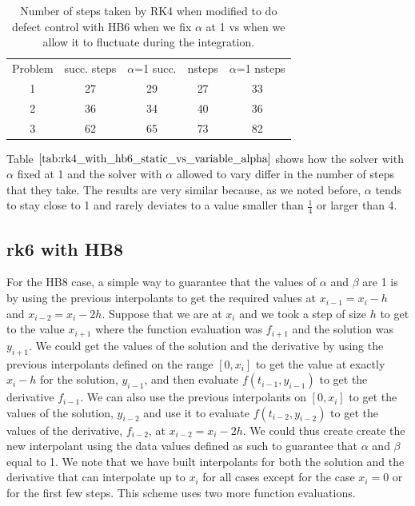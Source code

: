 \begin{table}[h]
\caption {Number of steps taken by RK4 when modified to do defect control with HB6 when we fix $\alpha$ at 1 vs when we allow it to fluctuate during the integration.} \label{tab:rk4_with_hb6_static_vs_variable_alpha}
\begin{center}
\begin{tabular}{ c c c c c } 
Problem & succ. steps & $\alpha$=1 succ. & nsteps & $\alpha$=1 nsteps \\ 
1       & 27                      &        29               & 27         & 33\\ 
2       & 36                      &        34               & 40         & 36\\
3       & 62                      &        65               & 73         & 82\\
\end{tabular}
\end{center}
\end{table}

Table $\ref{tab:rk4_with_hb6_static_vs_variable_alpha}$ shows how the solver with $\alpha$ fixed at 1 and the solver with $\alpha$ allowed to vary differ in the number of steps that they take. The results are very similar because, as we noted before, $\alpha$ tends to stay close to 1 and rarely deviates to a value smaller than $\frac{1}{4}$ or larger than 4.

\subsection{rk6 with HB8} For the HB8 case, a simple way to guarantee that the values of $\alpha$ and $\beta$ are 1 is by using the previous interpolants to get the required values at $x_{i - 1}=x_i-h$ and $x_{i - 2}=x_i-2h$. Suppose that we are at $x_i$ and we took a step of size $h$ to get to the value $x_{i + 1}$ where the function evaluation was $f_{i + 1}$ and the solution was $y_{i + 1}$. We could get the values of the solution and the derivative by using the previous interpolants defined on the range $[0, x_i]$ to get the value at exactly $x_i - h$ for the solution, $y_{i - 1}$, and then evaluate $f(t_{i-1}, y_{i-1})$ to get the derivative $f_{i - 1}$.  We can also use the previous interpolants on $[0, x_i]$ to get the values of the solution, $y_{i-2}$ and use it to evaluate $f(t_{i-2}, y_{i-2})$ to get the values of the derivative, $f_{i-2}$, at $x_{i-2} = x_i - 2h$. We could thus create create the new interpolant using the data values defined as such to guarantee that $\alpha$ and $\beta$ equal to 1. We note that we have built interpolants for both the solution and the derivative that  can interpolate up to $x_i$ for all cases except for the case $x_i = 0$ or for the first few steps. This scheme uses two more function evaluations.

